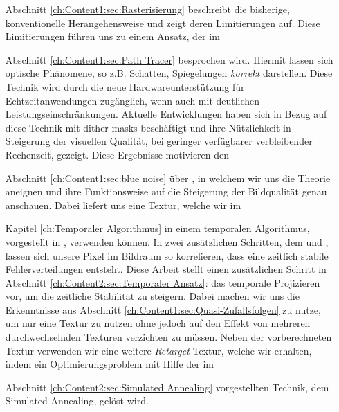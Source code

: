 \begin{itemize}
    \item[Abschnitt \ref{ch:Content1:sec:Rasterisierung}] beschreibt die bisherige, konventionelle Herangehensweise und zeigt deren Limitierungen auf. Diese 
        Limitierungen führen uns zu einem Ansatz, der im 

    \item[Abschnitt \ref{ch:Content1:sec:Path Tracer}] besprochen wird. Hiermit lassen sich optische Phänomene, so z.B. Schatten, Spiegelungen \textit{korrekt} darstellen.
        Diese Technik wird durch die neue Hardwareunterstützung für Echtzeitanwendungen zugänglich, wenn auch mit deutlichen Leistungseinschränkungen.
        Aktuelle Entwicklungen \cite{georgiev2016blue} haben sich in Bezug auf diese Technik mit  dither masks beschäftigt
        und ihre Nützlichkeit in Steigerung der visuellen Qualität, bei geringer verfügbarer verbleibender Rechenzeit, gezeigt. Diese Ergebnisse motivieren den

    \item[Abschnitt \ref{ch:Content1:sec:blue noise}] über , in welchem wir uns die Theorie aneignen und ihre Funktionsweise auf die Steigerung der 
        Bildqualität genau anschauen. Dabei liefert uns \cite{bluenoisechrisschied} eine  Textur, welche wir im

    \item[Kapitel \ref{ch:Temporaler Algorithmus}]in einem temporalen Algorithmus, vorgestellt in \cite{hal02158423}, verwenden können. In zwei zusätzlichen Schritten, dem 
     und , lassen sich unsere Pixel im Bildraum so korrelieren, dass eine zeitlich stabile Fehlerverteilungen
    entsteht. Diese Arbeit stellt einen zusätzlichen Schritt in Abschnitt \ref{ch:Content2:sec:Temporaler Ansatz}: das temporale Projizieren vor, um die zeitliche Stabilität zu steigern. 
    Dabei machen wir uns die Erkenntnisse aus Abschnitt \ref{ch:Content1:sec:Quasi-Zufallsfolgen} zu nutze, um nur eine Textur zu nutzen ohne jedoch auf den Effekt von mehreren durchwechselnden
    Texturen verzichten zu müssen. Neben der vorberechneten  Textur verwenden wir eine weitere \textit{Retarget}-Textur, welche wir erhalten, 
    indem ein Optimierungsproblem mit Hilfe der im  

    \item[Abschnitt \ref{ch:Content2:sec:Simulated Annealing}]vorgestellten Technik, dem Simulated Annealing, gelöst wird.   

\end{itemize}
 

